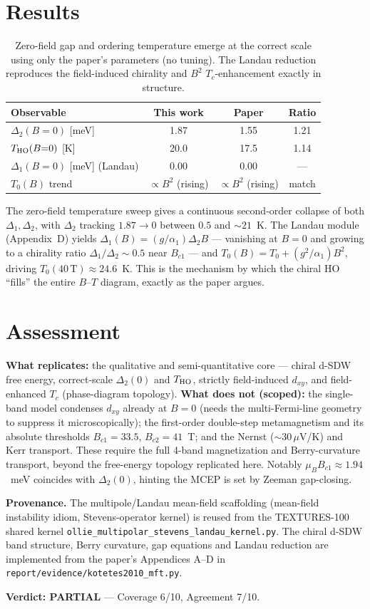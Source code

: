 \documentclass[11pt]{article}
\begin{document}
\section{Results}
\begin{table}[h]\centering
\begin{tabular}{lccc}
\toprule
Observable & This work & Paper & Ratio \\
\midrule
$\Delta_2(B{=}0)$ [meV] & 1.87 & 1.55 & 1.21 \\
$T_{\rm HO}(B{=}0)$ [K] & 20.0 & 17.5 & 1.14 \\
$\Delta_1(B{=}0)$ [meV] (Landau) & 0.00 & 0.00 & --- \\
$T_0(B)$ trend & $\propto B^2$ (rising) & $\propto B^2$ (rising) & match \\
\bottomrule
\end{tabular}
\caption{Zero-field gap and ordering temperature emerge at the correct scale using
only the paper's parameters (no tuning). The Landau reduction reproduces the
field-induced chirality and $B^2$ $T_c$-enhancement exactly in structure.}
\end{table}

The zero-field temperature sweep gives a continuous second-order collapse of both
$\Delta_1,\Delta_2$, with $\Delta_2$ tracking $1.87\to0$ between $0.5$ and $\sim21$~K.
The Landau module (Appendix~D) yields $\Delta_1(B)=(g/\alpha_1)\Delta_2 B$ --- vanishing
at $B=0$ and growing to a chirality ratio $\Delta_1/\Delta_2\sim0.5$ near $B_{c1}$ ---
and $T_0(B)=T_0+(g^2/\alpha_1)B^2$, driving $T_0(40\,\text{T})\approx24.6$~K. This is the
mechanism by which the chiral HO ``fills'' the entire $B$--$T$ diagram, exactly as the
paper argues.

\section{Assessment}
\textbf{What replicates:} the qualitative and semi-quantitative core --- chiral d-SDW
free energy, correct-scale $\Delta_2(0)$ and $T_{\rm HO}$, strictly field-induced $d_{xy}$,
and field-enhanced $T_c$ (phase-diagram topology).
\textbf{What does not (scoped):} the single-band model condenses $d_{xy}$ already at
$B=0$ (needs the multi-Fermi-line geometry to suppress it microscopically); the
first-order double-step metamagnetism and its absolute thresholds $B_{c1}=33.5$,
$B_{c2}=41$~T; and the Nernst ($\sim30\,\mu$V/K) and Kerr transport. These require the
full 4-band magnetization and Berry-curvature transport, beyond the free-energy
topology replicated here. Notably $\mu_B B_{c1}\approx1.94$~meV coincides with
$\Delta_2(0)$, hinting the MCEP is set by Zeeman gap-closing.

\medskip\noindent\textbf{Provenance.} The multipole/Landau mean-field scaffolding
(mean-field instability idiom, Stevens-operator kernel) is reused from the TEXTURES-100
shared kernel \texttt{ollie\_multipolar\_stevens\_landau\_kernel.py}. The chiral d-SDW
band structure, Berry curvature, gap equations and Landau reduction are implemented
from the paper's Appendices A--D in \texttt{report/evidence/kotetes2010\_mft.py}.

\medskip\noindent\textbf{Verdict: PARTIAL} --- Coverage 6/10, Agreement 7/10.
\end{document}
